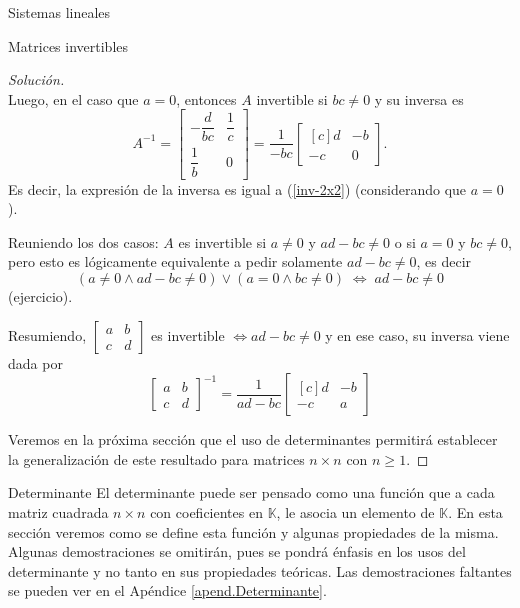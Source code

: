 \documentclass[a4paper,12pt,twoside,spanish]{amsbook}
\theoremstyle{definition}
\theoremstyle{remark}
\newcommand{\K}{\mathbb K}
\begin{document}
\begin{chapter}{Sistemas lineales}
\begin{section}{Matrices invertibles}
\begin{proof}[Solución]
\begin{equation*}
				\end{equation*}  
				Luego, en el caso  que $a=0$, entonces $A$ invertible si  $b c\not=0$ y su inversa es
				\begin{equation*}
				A^{-1} = \begin{bmatrix}-\dfrac{d}{bc}&\dfrac{1}{c}\\[6pt]\dfrac{1}{b}&0\end{bmatrix} = 
				\dfrac{1}{-bc}
				\begin{bmatrix*}[c]d&-b\\-c&0\end{bmatrix*}.
				\end{equation*}
				Es decir, la expresión de la inversa es igual a (\ref{inv-2x2}) (considerando que  $a=0$).
				
				Reuniendo los dos casos:  $A$ es invertible si $a\not=0$ y  $ad-bc\not=0$ o si $a=0$ y $bc\not=0$, pero esto es lógicamente equivalente a pedir solamente  $ad-bc\not=0$, es decir
				\begin{equation*}
				(a\not=0 \wedge ad-bc\not=0) \vee (a=0 \wedge bc\not=0)\; \Leftrightarrow\; ad-bc\not=0
				\end{equation*}
				(ejercicio).
				
				Resumiendo, $\begin{bmatrix*} a&b\\c&d\end{bmatrix*}$ es invertible  $\Leftrightarrow ad-bc\not=0$  y en ese caso,  su inversa viene dada por 
				\begin{equation}
				\begin{bmatrix*} a&b\\c&d\end{bmatrix*}^{-1} =  \dfrac{1}{ad-bc}
				\begin{bmatrix*}[c]d&-b\\-c&a\end{bmatrix*}
				\end{equation} 
				
				\vskip 6pt
				
				Veremos en la próxima sección que el uso de determinantes permitirá establecer la generalización de este resultado para matrices $n \times n$ con $n\ge 1$.
				
			\end{proof}
			
		\end{section}
		
		
	\begin{section}{Determinante}\label{seccion-determinate}
	El determinante puede ser pensado como una función que a cada matriz cuadrada $n \times n$ con coeficientes en $\K$,  le asocia un elemento de $\K$. En  esta sección veremos como se define esta función y algunas propiedades de la misma. Algunas  demostraciones se omitirán, pues se pondrá énfasis en los usos del determinante y no tanto en sus propiedades teóricas. Las demostraciones faltantes se pueden ver en el Apéndice \ref{apend.Determinante}.
	

\end{section}
\end{chapter}
\end{document}
